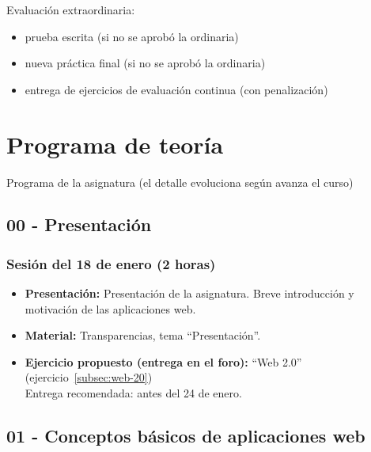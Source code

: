 \documentclass[a4paper,12pt]{article}
\begin{document}
Evaluación extraordinaria:

\begin{itemize}
\item prueba escrita (si no se aprobó la ordinaria)
\item nueva práctica final (si no se aprobó la ordinaria)
\item entrega de ejercicios de evaluación continua (con penalización)
\end{itemize}

\newpage

\section{Programa de teoría}

Programa de la asignatura (el detalle evoluciona según avanza el curso)

\subsection{00 - Presentación}

\subsubsection{Sesión del 18 de enero (2 horas)}

\begin{itemize}
\item \textbf{Presentación:} Presentación de la asignatura. Breve introducción y motivación de las aplicaciones web.
\item \textbf{Material:} Transparencias, tema ``Presentación''.
\item \textbf{Ejercicio propuesto (entrega en el foro):} ``Web 2.0'' (ejercicio~\ref{subsec:web-20}) \\
  Entrega recomendada: antes del 24 de enero.
\end{itemize}


\subsection{01 - Conceptos básicos de aplicaciones web}
\end{document}
